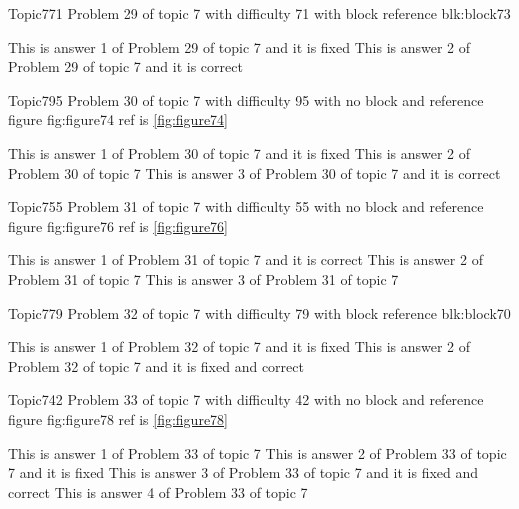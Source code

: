 \documentclass[master]{exam}
\begin{document}
\begin{problem}[requires=blk:block73]{Topic7}{71}
	Problem 29 of topic 7 with difficulty 71 with block reference blk:block73
	\begin{answers}
		\answer[fixed] This is answer 1 of Problem 29 of topic 7 and it is fixed
		\answer[correct] This is answer 2 of Problem 29 of topic 7 and it is correct
	\end{answers}
\end{problem}

\begin{problem}{Topic7}{95}
	Problem 30 of topic 7 with difficulty 95 with no block and reference figure fig:figure74 ref is \ref{fig:figure74}
	\begin{answers}
		\answer[fixed] This is answer 1 of Problem 30 of topic 7 and it is fixed
		\answer This is answer 2 of Problem 30 of topic 7 
		\answer[correct] This is answer 3 of Problem 30 of topic 7 and it is correct
	\end{answers}
\end{problem}

\begin{problem}{Topic7}{55}
	Problem 31 of topic 7 with difficulty 55 with no block and reference figure fig:figure76 ref is \ref{fig:figure76}
	\begin{answers}
		\answer[correct] This is answer 1 of Problem 31 of topic 7 and it is correct
		\answer This is answer 2 of Problem 31 of topic 7 
		\answer This is answer 3 of Problem 31 of topic 7 
	\end{answers}
\end{problem}

\begin{problem}[requires=blk:block70]{Topic7}{79}
	Problem 32 of topic 7 with difficulty 79 with block reference blk:block70
	\begin{answers}
		\answer[fixed] This is answer 1 of Problem 32 of topic 7 and it is fixed
		 This is answer 2 of Problem 32 of topic 7 and it is fixed and correct
	\end{answers}
\end{problem}

\begin{problem}{Topic7}{42}
	Problem 33 of topic 7 with difficulty 42 with no block and reference figure fig:figure78 ref is \ref{fig:figure78}
	\begin{answers}
		\answer This is answer 1 of Problem 33 of topic 7 
		\answer[fixed] This is answer 2 of Problem 33 of topic 7 and it is fixed
		 This is answer 3 of Problem 33 of topic 7 and it is fixed and correct
		\answer This is answer 4 of Problem 33 of topic 7 
	\end{answers}
\end{problem}
\end{document}
